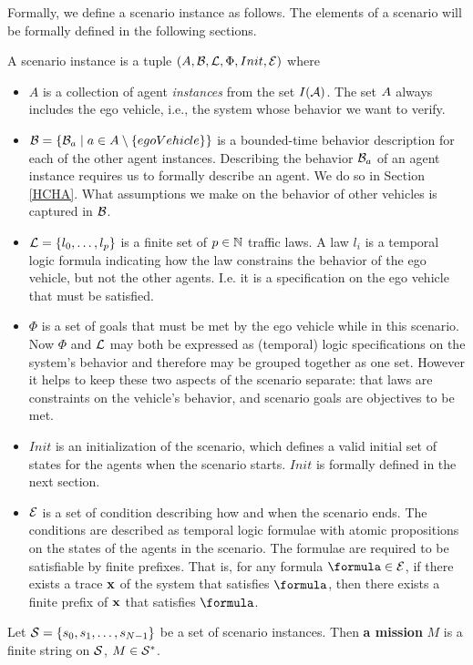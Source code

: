 Formally, we define a scenario instance as follows. 
The elements of a scenario will be formally defined in the following sections.
\begin{defn}
	A scenario instance is a tuple $(A,\mathcal{B}, \mathcal{L}, \Phi, Init, \mathcal{E})$ where
\begin{itemize}
	\item $A$ is a collection of agent \emph{instances} from the set $I(\mathcal{A})$.
	The set $A$ always includes the ego vehicle, i.e., the system whose behavior we want to verify.
	\item $\mathcal{B} = \{\mathcal{B}_a \;|\; a \in A \setminus \{egoVehicle\}\}$ is a bounded-time behavior description for each of the other agent instances.
	Describing the behavior $\mathcal{B}_a$ of an agent instance requires us to formally describe an agent. 
	We do so in Section \ref{HCHA}.
	What assumptions we make on the behavior of other vehicles is captured in $\mathcal{B}$.
	\item $\mathcal{L} = \{l_0,\ldots,l_p\}$ is a finite set of $p \in \mathbb{N}$ traffic laws. 
	A law $l_i$ is a temporal logic formula indicating how the law constrains the behavior of the ego vehicle, but not the other agents. 
	I.e. it is a specification on the ego vehicle that must be satisfied. 
	\item $\Phi$ is a set of goals that must be met by the ego vehicle while in this scenario. 
	Now $\Phi$ and $\mathcal{L}$ may both be expressed as (temporal) logic specifications on the system's behavior and therefore may be grouped together as one set.
	However it helps to keep these two aspects of the scenario separate: 
	that laws are constraints on the vehicle's behavior, and scenario goals are objectives to be met.
	\item $Init$ is an initialization of the scenario, which defines a valid initial set of states for the agents when the scenario starts. $Init$ is formally defined in the next section.
	\item $\mathcal{E}$ is a set of condition describing how and when the scenario ends.
	The conditions are described as temporal logic formulae with atomic propositions on the states of the agents in the scenario.
	The formulae are required to be satisfiable by finite prefixes.
	That is, for any formula $\formula \in \exitConditions$, if there exists a trace $\mathbf{x}$ of the system that satisfies $\formula$, then there exists a finite prefix of $\mathbf{x}$ that satisfies $\formula$.
\end{itemize}
Let $\mathcal{S} = \{s_0,s_1,\ldots,s_{N-1}\}$ be a set of scenario instances. 
Then \textbf{a mission} $M$ is a finite string on $\mathcal{S}$, $M \in \mathcal{S}^*$.
\end{defn}

